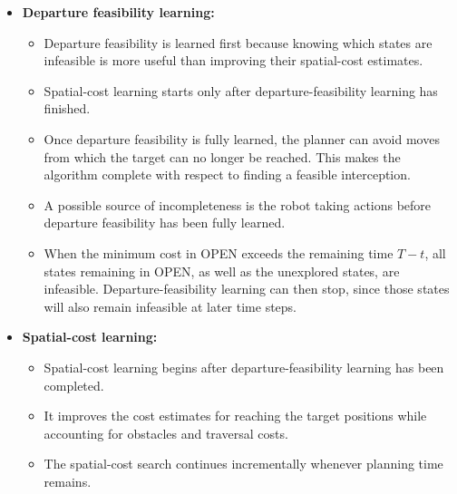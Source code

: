 \documentclass[11pt]{article}
\begin{document}
\begin{itemize}
  \item \textbf{Departure feasibility learning:}
        \begin{itemize}
          \item Departure feasibility is learned first because knowing which
                states are infeasible is more useful than improving their spatial-cost
                estimates.

          \item Spatial-cost learning starts only after departure-feasibility
                learning has finished.

          \item Once departure feasibility is fully learned, the planner can
                avoid moves from which the target can no longer be reached. This makes
                the algorithm complete with respect to finding a feasible interception.

          \item A possible source of incompleteness is the robot taking actions
                before departure feasibility has been fully learned.

          \item When the minimum cost in OPEN exceeds the remaining time
                \(T-t\), all states remaining in OPEN, as well as the unexplored
                states, are infeasible. Departure-feasibility learning can then stop,
                since those states will also remain infeasible at later time steps.
        \end{itemize}

  \item \textbf{Spatial-cost learning:}
        \begin{itemize}
          \item Spatial-cost learning begins after departure-feasibility learning
                has been completed.

          \item It improves the cost estimates for reaching the target positions
                while accounting for obstacles and traversal costs.

          \item The spatial-cost search continues incrementally whenever
                planning time remains.
        \end{itemize}
\end{itemize}
\end{document}
